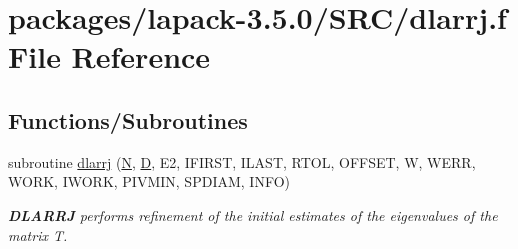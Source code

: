 \hypertarget{dlarrj_8f}{}\section{packages/lapack-\/3.5.0/\+S\+R\+C/dlarrj.f File Reference}
\label{dlarrj_8f}
\subsection*{Functions/\+Subroutines}
\begin{DoxyCompactItemize}
\item 
subroutine \hyperlink{group__auxOTHERauxiliary_ga7cdb25c9766674132d73bcbba824ab31}{dlarrj} (\hyperlink{polmisc_8c_a0240ac851181b84ac374872dc5434ee4}{N}, \hyperlink{odrpack_8h_a7dae6ea403d00f3687f24a874e67d139}{D}, E2, I\+F\+I\+R\+S\+T, I\+L\+A\+S\+T, R\+T\+O\+L, O\+F\+F\+S\+E\+T, W, W\+E\+R\+R, W\+O\+R\+K, I\+W\+O\+R\+K, P\+I\+V\+M\+I\+N, S\+P\+D\+I\+A\+M, I\+N\+F\+O)
\begin{DoxyCompactList}\small\item\em {\bfseries D\+L\+A\+R\+R\+J} performs refinement of the initial estimates of the eigenvalues of the matrix T. \end{DoxyCompactList}\end{DoxyCompactItemize}
